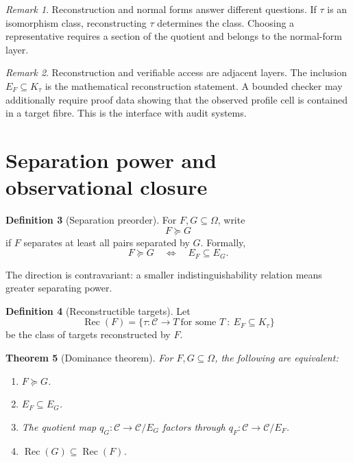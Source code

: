 \documentclass[11pt]{article}
\newtheorem{theorem}{Theorem}[section]
\theoremstyle{definition}
\newtheorem{definition}[theorem]{Definition}
\theoremstyle{remark}
\newtheorem{remark}[theorem]{Remark}
\begin{document}
\begin{remark}
Reconstruction and normal forms answer different questions.  If \(\tau\) is an isomorphism class, reconstructing \(\tau\) determines the class.  Choosing a representative requires a section of the quotient and belongs to the normal-form layer.
\end{remark}

\begin{remark}
Reconstruction and verifiable access are adjacent layers.  The inclusion \(E_F\subseteq K_\tau\) is the mathematical reconstruction statement.  A bounded checker may additionally require proof data showing that the observed profile cell is contained in a target fibre.  This is the interface with audit systems.
\end{remark}

\section{Separation power and observational closure}

\begin{definition}[Separation preorder]
For \(F,G\subseteq\Omega\), write
\[
F\succeq G
\]
if \(F\) separates at least all pairs separated by \(G\).  Formally,
\[
F\succeq G
\quad\Longleftrightarrow\quad
E_F\subseteq E_G.
\]
\end{definition}

The direction is contravariant: a smaller indistinguishability relation means greater separating power.

\begin{definition}[Reconstructible targets]
Let
\[
\operatorname{Rec}(F)=
\{\tau:\mathcal C\to T\ \text{for some }T\ :\ E_F\subseteq K_\tau\}
\]
be the class of targets reconstructed by \(F\).
\end{definition}

\begin{theorem}[Dominance theorem]
For \(F,G\subseteq\Omega\), the following are equivalent:
\begin{enumerate}[label=(\alph*)]
\item \(F\succeq G\).
\item \(E_F\subseteq E_G\).
\item The quotient map \(q_G:\mathcal C\to\mathcal C/E_G\) factors through \(q_F:\mathcal C\to\mathcal C/E_F\).
\item \(\operatorname{Rec}(G)\subseteq\operatorname{Rec}(F)\).
\end{enumerate}
\end{theorem}
\end{document}
